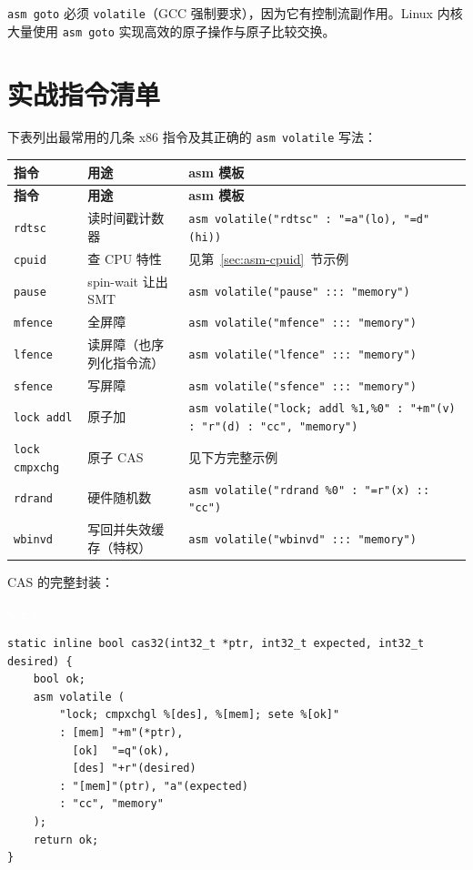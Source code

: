 \documentclass[12pt,a4paper,fontset=fandol]{ctexbook}
\newcommand{\cpplabel}{%
  \begin{tcolorbox}[enhanced,colback=cppheadbg,colframe=cppheadbg,
    arc=1mm,boxrule=0mm,left=6pt,right=6pt,top=2pt,bottom=2pt,
    halign=left,oversize]
    \textcolor{white}{\small\bfseries C++}
  \end{tcolorbox}\vspace{-4pt}}
\newcommand{\kw}[1]{\texttt{#1}}
\begin{document}
\texttt{asm goto} 必须 \kw{volatile}（GCC 强制要求），因为它有控制流副作用。Linux 内核大量使用 \texttt{asm goto} 实现高效的原子操作与原子比较交换。

\section{实战指令清单}\label{sec:asm-recipes}

下表列出最常用的几条 x86 指令及其正确的 \texttt{asm volatile} 写法：

\begin{longtable}{>{\raggedright\arraybackslash}p{2.0cm}>{\raggedright\arraybackslash}p{4.5cm}>{\raggedright\arraybackslash}p{6.7cm}}
\toprule
\textbf{指令} & \textbf{用途} & \textbf{asm 模板} \\
\midrule
\endfirsthead
\toprule
\textbf{指令} & \textbf{用途} & \textbf{asm 模板} \\
\midrule
\endhead
\texttt{rdtsc}     & 读时间戳计数器            & \texttt{asm volatile("rdtsc" : "=a"(lo), "=d"(hi))} \\
\texttt{cpuid}     & 查 CPU 特性               & 见第~\ref{sec:asm-cpuid}~节示例 \\
\texttt{pause}     & spin-wait 让出 SMT        & \texttt{asm volatile("pause" ::: "memory")} \\
\texttt{mfence}    & 全屏障                    & \texttt{asm volatile("mfence" ::: "memory")} \\
\texttt{lfence}    & 读屏障（也序列化指令流）  & \texttt{asm volatile("lfence" ::: "memory")} \\
\texttt{sfence}    & 写屏障                    & \texttt{asm volatile("sfence" ::: "memory")} \\
\texttt{lock addl} & 原子加                    & \texttt{asm volatile("lock; addl \%1,\%0" : "+m"(v) : "r"(d) : "cc", "memory")} \\
\texttt{lock cmpxchg} & 原子 CAS               & 见下方完整示例 \\
\texttt{rdrand}    & 硬件随机数                & \texttt{asm volatile("rdrand \%0" : "=r"(x) :: "cc")} \\
\texttt{wbinvd}    & 写回并失效缓存（特权）    & \texttt{asm volatile("wbinvd" ::: "memory")} \\
\bottomrule
\end{longtable}

CAS 的完整封装：

\cpplabel
\begin{lstlisting}[style=cppstyle]
static inline bool cas32(int32_t *ptr, int32_t expected, int32_t desired) {
    bool ok;
    asm volatile (
        "lock; cmpxchgl %[des], %[mem]; sete %[ok]"
        : [mem] "+m"(*ptr),
          [ok]  "=q"(ok),
          [des] "+r"(desired)
        : "[mem]"(ptr), "a"(expected)
        : "cc", "memory"
    );
    return ok;
}
\end{lstlisting}
\end{document}
